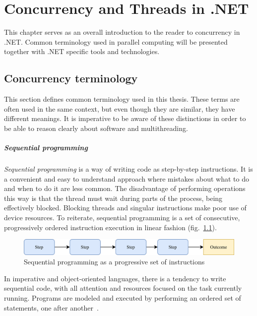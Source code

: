 \chapter{Concurrency and Threads in .NET}

This chapter serves as an overall introduction to the reader to concurrency in .NET. Common terminology used in parallel computing will be presented together with .NET specific tools and technologies. 

\section{Concurrency terminology}
This section defines common terminology used in this thesis. These terms are often used in the same context, but even though they are similar, they have different meanings. It is imperative to be aware of these distinctions in order to be able to reason clearly about software and multithreading.

\paragraph{Sequential programming\newline}
\emph{Sequential programming} is a way of writing code as step-by-step instructions. It is a convenient and easy to understand approach where mistakes about what to do and when to do it are less common.
The disadvantage of performing operations this way is that the thread must wait during parts of the process, being effectively blocked. Blocking threads and singular instructions make poor use of device resources.
To reiterate, sequential programming is a set of consecutive, progressively ordered instruction execution in linear fashion (fig.~\ref{fig:seq}).

\begin{figure}[htb]
	\centering
		\includegraphics[scale=1.0]{figures02/seq.png}
	\caption{Sequential programming as a progressive set of instructions}
	\label{fig:seq}
\end{figure}

In imperative and object-oriented languages, there is a tendency to write sequential code, with all attention and resources focused on the task currently running. Programs are modeled and executed by performing an ordered set of statements, one after another~\cite{terrell_2018}.

